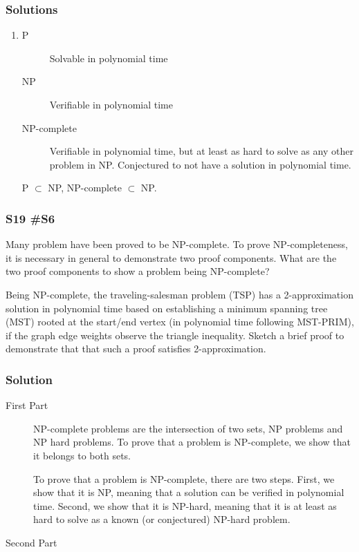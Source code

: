 \subsubsection{Solutions}

\begin{enumerate}[label=\alph*.]
	\item 
	\begin{description}
		\item [P] Solvable in polynomial time
		\item [NP] Verifiable in polynomial time
		\item [NP-complete] Verifiable in polynomial time, but at least as hard to solve as any other problem in NP.  Conjectured to not have a solution in polynomial time.  
	\end{description}
	
	P $\subset$ NP, NP-complete $\subset$ NP.
	
\end{enumerate}

\subsubsection{	S19 \#S6}
Many problem have been proved to be NP-complete.  To prove NP-completeness, it is necessary in general to demonstrate two proof components.  What are the two proof components to show a problem being NP-complete?
	
	Being NP-complete, the traveling-salesman problem (TSP) has a 2-approximation solution in polynomial time based on establishing a minimum spanning tree (MST) rooted at the start/end vertex (in polynomial time following MST-PRIM), if the graph edge weights observe the triangle inequality.  Sketch a brief proof to demonstrate that that such a proof satisfies 2-approximation.  

\subsubsection{Solution}

\begin{description}
	\item [First Part]
	
	NP-complete problems are the intersection of two sets, NP problems and NP hard problems.  To prove that a problem is NP-complete, we show that it belongs to both sets.  
	
	To prove that a problem is NP-complete, there are two steps.  First, we show that it is NP, meaning that a solution can be verified in polynomial time.  Second, we show that it is NP-hard, meaning that it is at least as hard to solve as a known (or conjectured) NP-hard problem.  
	
	\item [Second Part]
\end{description}


